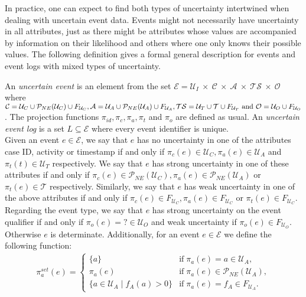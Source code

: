 In practice, one can expect to find both types of uncertainty intertwined when dealing with uncertain event data.
Events might not necessarily have uncertainty in all attributes, just as there might be attributes whose values are accompanied by information on their likelihood and others where one only knows their possible values.
The following definition gives a formal general description for events and event logs with mixed types of uncertainty.
%
\begin{definition}
An \emph{uncertain event} is an element from the set
$\mathcal{E} = \mathcal{U}_I \: \times \:
\mathcal{C} \: \times \:
\mathcal{A} \: \times \:
\mathcal{TS} \: \times \:
\mathcal{O} $
where 
$
\mathcal{C} = \mathcal{U}_C \cup \mathcal{P}_{NE}(\mathcal{U}_C) \cup F_{\mathcal{U}_C},\\
\mathcal{A} = \mathcal{U}_A \cup \mathcal{P}_{NE}(\mathcal{U}_A) \cup F_{\mathcal{U}_A},
\mathcal{TS} = \mathcal{U}_T \cup \mathcal{T} \cup F_{\mathcal{U}_T} 
\text{ and }
\mathcal{O} = \mathcal{U}_O \cup F_{\mathcal{U}_O}$.
The projection functions $\pi_{id}, \pi_c, \pi_a, \pi_t$ and $\pi_o$ are defined as usual.
An \emph{uncertain event log} is a set $L \subseteq \mathcal{E}$ where every event identifier is unique.\\
Given an event $e \in \mathcal{E}$, we say that $e$ has no uncertainty in one of the attributes case ID, activity or timestamp if and only if $\pi_c(e) \in \mathcal{U}_C, \pi_a(e) \in \mathcal{U}_A$ and $\pi_t(t) \in \mathcal{U}_T$ respectively.
We say that $e$ has strong uncertainty in one of these attributes if and only if $\pi_c(e) \in \mathcal{P}_{NE}(\mathcal{U}_C), \pi_a(e) \in \mathcal{P}_{NE}(\mathcal{U}_A)$ or $\pi_t(e) \in \mathcal{T}$ respectively.
Similarly, we say that $e$ has weak uncertainty in one of the above attributes if and only if $\pi_c(e) \in F_{\mathcal{U}_C}, \pi_a(e) \in F_{\mathcal{U}_C}$ or $\pi_t(e) \in F_{\mathcal{U}_C}$.
Regarding the event type, we say that $e$ has strong uncertainty on the event qualifier if and only if $\pi_o(e)=? \in \mathcal{U}_O$ and weak uncertainty if $\pi_o(e) \in F_{\mathcal{U}_O}$.
Otherwise $e$ is determinate.
Additionally, for an event $e \in \mathcal{E}$ we define the following function: 
\begin{align*}
\pi_a^{set}(e) = \begin{cases}
	\{a\} & \mbox{if} \; \pi_a(e)=a \in \mathcal{U}_A, \\
	\pi_a(e) & \mbox{if} \; \pi_a(e) \in \mathcal{P}_{NE}(\mathcal{U}_A),\\
	\{a \in \mathcal{U}_A \mid f_A(a)>0 \} & \mbox{if} \; \pi_a(e) = f_A \in F_{\mathcal{U}_A}.
	\end{cases}
\end{align*}
\end{definition}


